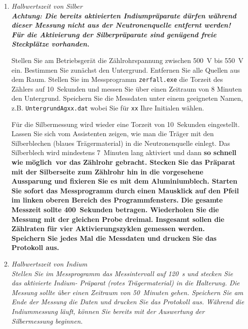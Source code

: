 \documentclass[landscape,twocolumn]{article}
\begin{document}
\begin{enumerate}
\item \it Halbwertszeit von Silber\rm \\
\bf Achtung: Die bereits aktivierten Indiumpr\"{a}parate d\"{u}rfen w\"{a}hrend dieser Messung nicht aus der Neutronenquelle entfernt werden! F\"{u}r die Aktivierung der Silberpr\"{a}parate sind gen\"{u}gend freie Steckpl\"{a}tze vorhanden.\rm

Stellen Sie am Betriebsger\"{a}t die Z\"{a}hlrohrspannung zwischen 500~V bis 550~V ein.
Bestimmen Sie zun\"{a}chst den Untergrund. Entfernen Sie alle Quellen aus dem Raum. Stellen Sie im
Messprogramm \verb"zerfall.exe" die Torzeit des Z\"{a}hlers auf 10~Sekunden und messen Sie \"{u}ber einen Zeitraum von 8 Minuten den Untergrund.
Speichern Sie die Messdaten unter einem geeigneten Namen, z.B. \verb"UntergrundAgxx.dat" wobei Sie f\"{u}r \verb"xx" Ihre Initialen w\"{a}hlen.

F\"{u}r die Silbermessung wird wieder eine Torzeit von 10~Sekunden eingestellt. Lassen Sie sich vom Assistenten zeigen, wie man die Tr\"{a}ger mit den Silberblechen
(blaues Tr\"{a}germaterial) in die Neutronenquelle einlegt. Das Silberblech wird mindestens 7~Minuten lang aktiviert
und dann \bf so schnell wie m\"{o}glich\rm~vor das Z\"{a}hlrohr gebracht. Stecken Sie das Pr\"{a}parat mit der Silberseite
zum Z\"{a}hlrohr hin in die vorgesehene Aussparung und fixieren Sie es mit dem Aluminiumblech. Starten Sie sofort das
Messprogramm durch einen Mausklick auf den Pfeil im linken oberen Bereich des Programmfensters. Die gesamte Messzeit sollte 400~Sekunden betragen.
\bf Wiederholen Sie die Messung mit der gleichen Probe dreimal. Insgesamt sollen die Z\"{a}hlraten f\"{u}r vier Aktivierungszyklen gemessen werden.\rm~
Speichern Sie jedes Mal die Messdaten und drucken Sie das Protokoll aus.

\item \it Halbwertszeit von Indium\rm \\

Stellen Sie im Messprogramm das Messintervall auf 120~s und stecken Sie das aktivierte Indium- Pr\"{a}parat (rotes Tr\"{a}germaterial) in die Halterung.
Die Messung sollte \"{u}ber einen Zeitraum von 50~Minuten gehen. Speichern Sie am Ende der Messung die Daten und drucken Sie das Protokoll aus.
W\"{a}hrend die Indiummessung l\"{a}uft, k\"{o}nnen Sie bereits mit der Auswertung der Silbermessung beginnen.



\end{enumerate}
\end{document}
